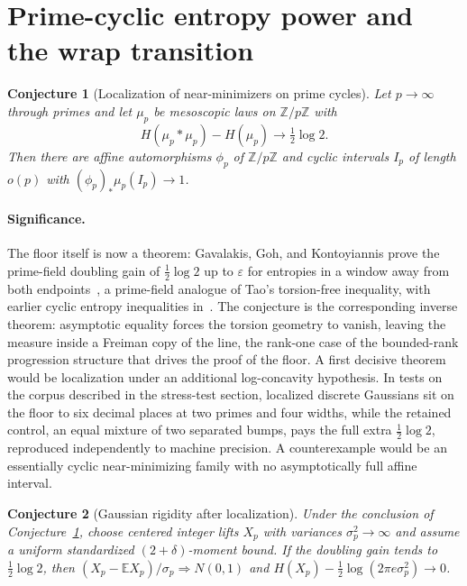 \documentclass[11pt]{article}
\newtheorem{conjecture}{Conjecture}
\theoremstyle{definition}
\begin{document}
\section{Prime-cyclic entropy power and the wrap transition}

\begin{conjecture}[Localization of near-minimizers on prime cycles]\label{ac11}
Let $p\to\infty$ through primes and let $\mu_p$ be mesoscopic laws on $\mathbb Z/p\mathbb Z$ with
\[
H(\mu_p*\mu_p)-H(\mu_p)\to\tfrac12\log2.
\]
Then there are affine automorphisms $\phi_p$ of $\mathbb Z/p\mathbb Z$ and cyclic intervals $I_p$ of length $o(p)$ with $(\phi_p)_*\mu_p(I_p)\to1$.
\end{conjecture}

\paragraph{Significance.}
The floor itself is now a theorem: Gavalakis, Goh, and Kontoyiannis prove the prime-field doubling gain of $\tfrac12\log2$ up to $\varepsilon$ for entropies in a window away from both endpoints~\cite{GGK26}, a prime-field analogue of Tao's torsion-free inequality, with earlier cyclic entropy inequalities in~\cite{MWW21}.  The conjecture is the corresponding inverse theorem: asymptotic equality forces the torsion geometry to vanish, leaving the measure inside a Freiman copy of the line, the rank-one case of the bounded-rank progression structure that drives the proof of the floor.  A first decisive theorem would be localization under an additional log-concavity hypothesis.  In tests on the corpus described in the stress-test section, localized discrete Gaussians sit on the floor to six decimal places at two primes and four widths, while the retained control, an equal mixture of two separated bumps, pays the full extra $\tfrac12\log2$, reproduced independently to machine precision.  A counterexample would be an essentially cyclic near-minimizing family with no asymptotically full affine interval.

\begin{conjecture}[Gaussian rigidity after localization]\label{ac12}
Under the conclusion of Conjecture~\ref{ac11}, choose centered integer lifts $X_p$ with variances $\sigma_p^2\to\infty$ and assume a uniform standardized $(2+\delta)$-moment bound.  If the doubling gain tends to $\tfrac12\log2$, then $(X_p-\mathbb EX_p)/\sigma_p\Rightarrow N(0,1)$ and $H(X_p)-\tfrac12\log(2\pi e\sigma_p^2)\to0$.
\end{conjecture}
\end{document}
